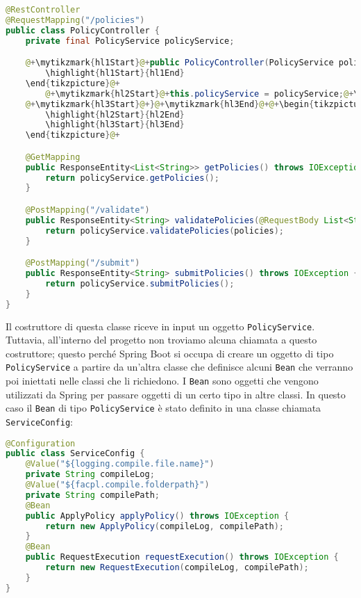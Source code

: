 \begin{lstlisting}[language=Java, caption=PolicyController, label=code:PolicyController, basicstyle=\fontsize{10}{11}\ttfamily]
@RestController
@RequestMapping("/policies")
public class PolicyController {
    private final PolicyService policyService;

    @+\mytikzmark{hl1Start}@+public PolicyController(PolicyService policyService) {@+\mytikzmark{hl1End}@+@+\begin{tikzpicture}[remember picture, overlay]
        \highlight{hl1Start}{hl1End}
    \end{tikzpicture}@+
        @+\mytikzmark{hl2Start}@+this.policyService = policyService;@+\mytikzmark{hl2End}@+
    @+\mytikzmark{hl3Start}@+}@+\mytikzmark{hl3End}@+@+\begin{tikzpicture}[remember picture, overlay]
        \highlight{hl2Start}{hl2End}
        \highlight{hl3Start}{hl3End}
    \end{tikzpicture}@+

    @GetMapping
    public ResponseEntity<List<String>> getPolicies() throws IOException {
        return policyService.getPolicies();
    }

    @PostMapping("/validate")
    public ResponseEntity<String> validatePolicies(@RequestBody List<String> policies) throws IOException {
        return policyService.validatePolicies(policies);
    }

    @PostMapping("/submit")
    public ResponseEntity<String> submitPolicies() throws IOException {
        return policyService.submitPolicies();
    }
}    
\end{lstlisting}
Il costruttore di questa classe riceve in input un oggetto \texttt{PolicyService}. Tuttavia, all'interno del progetto non troviamo alcuna chiamata a questo costruttore; questo perché Spring Boot si occupa di creare un oggetto di tipo \texttt{PolicyService} a partire da un'altra classe che definisce alcuni \texttt{Bean} che verranno poi iniettati nelle classi che li richiedono. I \texttt{Bean} sono oggetti che vengono utilizzati da Spring per passare oggetti di un certo tipo in altre classi. In questo caso il \texttt{Bean} di tipo \texttt{PolicyService} è stato definito in una classe chiamata \texttt{ServiceConfig}:
\begin{lstlisting}[language=Java, caption=ServiceConfig, label=code:ServiceConfig]
@Configuration
public class ServiceConfig {
    @Value("${logging.compile.file.name}")
    private String compileLog;
    @Value("${facpl.compile.folderpath}")
    private String compilePath;
    @Bean
    public ApplyPolicy applyPolicy() throws IOException {
        return new ApplyPolicy(compileLog, compilePath);
    }
    @Bean
    public RequestExecution requestExecution() throws IOException {
        return new RequestExecution(compileLog, compilePath);
    }
}
\end{lstlisting}
